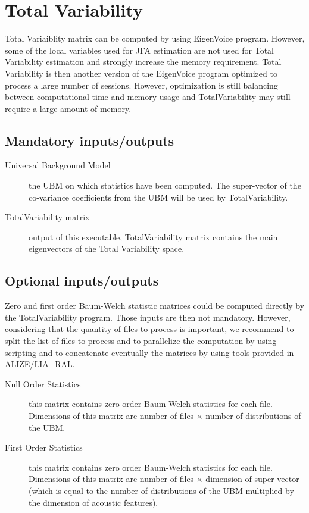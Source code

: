 \section{Total Variability}
%
Total Variaiblity matrix can be computed by using EigenVoice program. However, some of the local variables used for JFA estimation are not used for Total Variability estimation and strongly increase the memory requirement. Total Variability is then another version of the EigenVoice program optimized to process a large number of sessions.
However, optimization is still balancing between computational time and memory usage and TotalVariability may still require a large amount of memory.

\subsection{Mandatory inputs/outputs}
%
\begin{description}
\item[Universal Background Model] the UBM on which statistics have been computed. The super-vector of the co-variance coefficients from the UBM will be used by TotalVariability.
\item[TotalVariability matrix] output of this executable, TotalVariability matrix contains the main eigenvectors of the Total Variability  space.
\end{description}

\subsection{Optional inputs/outputs}
%
Zero and first order Baum-Welch statistic matrices could be computed directly by the TotalVariability program. Those inputs are then not mandatory. However, considering that the quantity of files to process is important, we recommend to split the list of files to process and to parallelize the computation by using scripting and to concatenate eventually the matrices by using tools provided in ALIZE/LIA\_RAL.

\begin{description}
%
\item[Null Order Statistics] this matrix contains zero order Baum-Welch statistics for each file. Dimensions of this matrix are number of files $\times$ number of distributions of the UBM.
%
\item[First Order Statistics] this matrix contains zero order Baum-Welch statistics for each file. Dimensions of this matrix are number of files $\times$ dimension of super vector (which is equal to the number of distributions of the UBM multiplied by the dimension of acoustic features).
\end{description}


